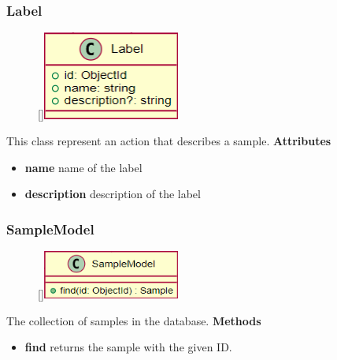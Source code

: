 \subsubsection{Label}
\label{Label}
\begin{figure}
    \raisebox{0pt}[\dimexpr{}\baselineskip\relax]{\includegraphics[width=4.5cm]{classes/workspace-management/5.png}}
\end{figure} 
\par
This class represent an action that describes a sample.
\newline
\newline
\textbf{Attributes}
\begin{itemize}
    \item \textbf{name} name of the label
    \item \textbf{description} description of the label
\end{itemize}

\subsubsection{SampleModel}
\label{SampleModel}
\begin{figure}
    \raisebox{0pt}[\dimexpr{}\baselineskip\relax]{\includegraphics[width=4.5cm]{classes/workspace-management/6.png}}
\end{figure} 
\par
The collection of samples in the database.
\newline
\newline
\textbf{Methods}
\begin{itemize}
    \item \textbf{find} returns the sample with the given ID.
\end{itemize}

